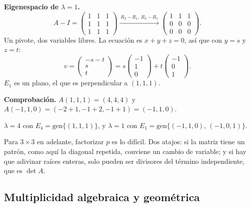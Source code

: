 \documentclass[11pt,letterpaper]{article}
\begin{document}
\begin{ejemplo}
    \textbf{Eigenespacio de $\lambda = 1$.}
    \[
        A - I = \begin{pmatrix} 1 & 1 & 1 \\ 1 & 1 & 1 \\
                                1 & 1 & 1 \end{pmatrix}
        \xrightarrow{\,R_2 - R_1,\ R_3 - R_1\,}
        \begin{pmatrix} 1 & 1 & 1 \\ 0 & 0 & 0 \\ 0 & 0 & 0
        \end{pmatrix} .
    \]
    Un pivote, dos variables libres. La ecuación es $x + y + z = 0$,
    así que con $y = s$ y $z = t$:
    \[
        v = \begin{pmatrix} -s - t \\ s \\ t \end{pmatrix}
          = s \begin{pmatrix} -1 \\ 1 \\ 0 \end{pmatrix}
          + t \begin{pmatrix} -1 \\ 0 \\ 1 \end{pmatrix} .
    \]
    $E_1$ es un plano, el que es perpendicular a $(1, 1, 1)$.

    \textbf{Comprobación.} $A(1, 1, 1) = (4, 4, 4)$ y
    $A(-1, 1, 0) = (-2 + 1, -1 + 2, -1 + 1) = (-1, 1, 0)$.
\end{ejemplo}

\begin{resultado}
    $\lambda = 4$ con $E_4 = \mathrm{gen}\{(1, 1, 1)\}$, y
    $\lambda = 1$ con
    $E_1 = \mathrm{gen}\{(-1, 1, 0),\, (-1, 0, 1)\}$.
\end{resultado}

\begin{idea}
    Para $3 \times 3$ en adelante, factorizar $p$ es lo difícil. Dos
    atajos: si la matriz tiene un patrón, como aquí la diagonal
    repetida, conviene un cambio de variable; y si hay que adivinar
    raíces enteras, solo pueden ser divisores del término
    independiente, que es $\det A$.
\end{idea}


\subsection*{Multiplicidad algebraica y geométrica}
\end{document}
